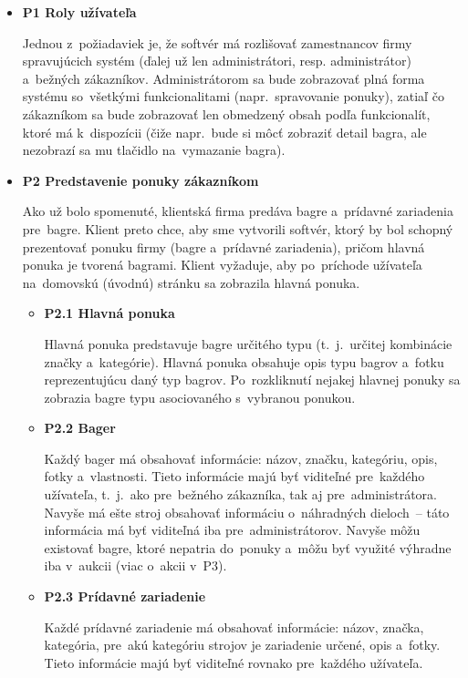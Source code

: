 \begin{itemize}
\item \textbf{P1 Roly užívateľa}

Jednou z~požiadaviek je, že softvér má rozlišovať zamestnancov firmy spravujúcich systém (ďalej už len administrátori, resp. administrátor) a~bežných zákazníkov. Administrátorom sa bude zobrazovať plná forma systému so~všetkými funkcionalitami (napr.~spravovanie ponuky), zatiaľ čo zákazníkom sa bude zobrazovať len obmedzený obsah podľa funkcionalít, ktoré má k~dispozícii (čiže napr.~bude si môcť zobraziť detail bagra, ale nezobrazí sa mu tlačidlo na~vymazanie bagra).

\item \textbf{P2 Predstavenie ponuky zákazníkom}

Ako už bolo spomenuté, klientská firma predáva bagre a~prídavné zariadenia pre~bagre. Klient preto chce, aby sme vytvorili softvér, ktorý by bol schopný prezentovať ponuku firmy (bagre a~prídavné zariadenia), pričom hlavná ponuka je tvorená bagrami. Klient vyžaduje, aby po~príchode užívateľa na~domovskú (úvodnú) stránku sa zobrazila hlavná ponuka.

\begin{itemize}
\item \textbf{P2.1 Hlavná ponuka}

Hlavná ponuka predstavuje bagre určitého typu (t.~j.~určitej kombinácie značky a~kategórie). Hlavná ponuka obsahuje opis typu bagrov a~fotku reprezentujúcu daný typ bagrov. Po~rozkliknutí nejakej hlavnej ponuky sa zobrazia bagre typu asociovaného s~vybranou ponukou.

\item \textbf{P2.2 Bager}

Každý bager má obsahovať informácie: názov, značku, kategóriu, opis, fotky a~vlastnosti. Tieto informácie majú byť viditeľné pre~každého užívateľa, t.~j.~ako pre~bežného zákazníka, tak aj pre~administrátora. Navyše má ešte stroj obsahovať informáciu o~náhradných dieloch~-- táto informácia má byť viditeľná iba pre~administrátorov. Navyše môžu existovať bagre, ktoré nepatria do~ponuky a~môžu byť využité výhradne iba v~aukcii (viac o~akcii v~P3).

\item \textbf{P2.3 Prídavné zariadenie}

Každé prídavné zariadenie má obsahovať informácie: názov, značka, kategória, pre~akú kategóriu strojov je zariadenie určené, opis a~fotky. Tieto informácie majú byť viditeľné rovnako pre~každého užívateľa.


\end{itemize}
\end{itemize}
